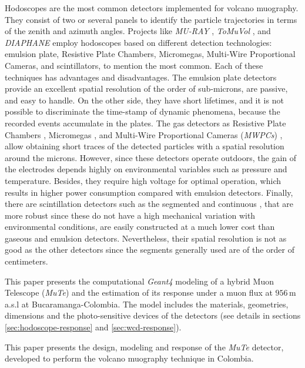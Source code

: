 \documentclass[submitting]{nst}
\begin{document}
Hodoscopes are the most common detectors implemented for volcano muography.  They consist of two or several panels to identify the particle trajectories in terms of the zenith and azimuth angles. Projects like \textsl{MU-RAY} \cite{AnastasioEtal2013}, \textsl{ToMuVol} \cite{CarloganuEtal2013}, and \textsl{DIAPHANE} \cite{LesparreEtal2010} employ hodoscopes based on different detection technologies: emulsion plate, Resistive Plate Chambers, Micromegas, Multi-Wire Proportional Cameras, and scintillators, to mention the most common. Each of these techniques has advantages and disadvantages. The emulsion plate detectors \cite{MorishimaEtal2017, Nagamine2016} provide an excellent spatial resolution of the order of sub-microns, are passive, and easy to handle. On the other side, they have short lifetimes, and it is not possible to discriminate the time-stamp of dynamic phenomena, because the recorded events accumulate in the plates. The gas detectors as Resistive Plate Chambers \cite{SehgalEtal2016, Fehr2012}, Micromegas \cite{BouteilleEtal2016}, and Multi-Wire Proportional Cameras (\textsl{MWPCs}) \cite{OlahEtal2018}, allow obtaining short traces of the detected particles with a spatial resolution around the microns. However, since these detectors operate outdoors, the gain of the electrodes depends highly on environmental variables such as pressure and temperature. Besides, they require high voltage for optimal operation, which results in higher power consumption compared with emulsion detectors. Finally, there are scintillation detectors such as the segmented \cite{FujiiEtal2013, LesparreEtal2012, TanakaEtal2009} and continuous \cite{NagamineEtal1995, AguiarEtal2015, TangEtal2016},  that are more robust since these do not have a high mechanical variation with environmental conditions, are easily constructed at a much lower cost than gaseous and emulsion detectors. Nevertheless, their spatial resolution is not as good as the other detectors since the segments generally used are of the order of centimeters.

This paper presents the computational \textsl{Geant4} modeling of a hybrid Muon Telescope (\textsl{MuTe}) and the estimation of its response under a muon flux at $956$\,m a.s.l at Bucaramanga-Colombia. The model includes the materials, geometries, dimensions and the photo-sensitive devices of the detectors (see details in sections \ref{sec:hodoscope-response} and \ref{sec:wcd-response}). 

This paper presents the design, modeling and response of the \textsl{MuTe} detector, developed to perform the volcano muography technique in Colombia.
\end{document}
